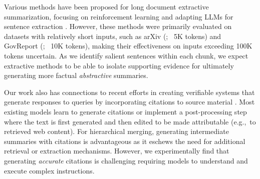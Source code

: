 Various methods have been proposed for long document extractive
summarization, focusing on reinforcement learning
\cite{gu-etal-2022-memsum, bian2023gosumextractivesummarizationlong}
and adapting LLMs for sentence extraction \cite{Lu2023HybridLD,
  Hemamou2024ScalingUS}. However, these methods were primarily
evaluated on datasets with relatively short inputs, such as arXiv
(\citealt{cohan-etal-2018-discourse}; ~5K tokens) and GovReport
(\citealt{huang-etal-2021-govreport}; ~10K tokens), making their
effectiveness on inputs exceeding 100K tokens uncertain. As we
identify salient sentences within each chunk, we expect extractive
methods to be able to isolate supporting evidence for ultimately
generating more factual \emph{abstractive} summaries.

Our work also  has connections to recent efforts in creating verifiable systems that generate responses to queries by incorporating citations to source material \cite{fierro2024learningplangeneratetext,nakano2022webgptbrowserassistedquestionansweringhuman}. Most existing models learn to generate citations \cite{menick2022teachinglanguagemodelssupport,nakano2022webgptbrowserassistedquestionansweringhuman} or implement a post-processing step \cite{Bohnet:Ea:2022,gao-etal-2023-enabling} where the text is first generated and then edited to be made attributable (e.g.,~to retrieved web content).  For hierarchical merging, generating intermediate summaries with citations is advantageous as it  eschews the need for additional retrieval or extraction mechanisms. However, we experimentally find that generating \emph{accurate} citations is challenging requiring models to understand and execute complex instructions. 






